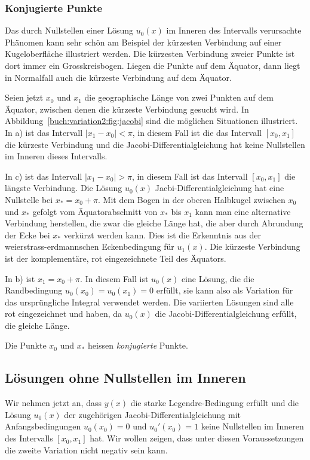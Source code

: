 %
%
\subsubsection{Konjugierte Punkte}

Das durch Nullstellen einer Lösung $u_0(x)$ im Inneren des Intervalls
verursachte Phänomen kann sehr schön am Beispiel der kürzesten
Verbindung auf einer Kugeloberfläche illustriert werden.
Die kürzesten Verbindung zweier Punkte ist dort immer ein Grosskreisbogen.
Liegen die Punkte auf dem Äquator, dann liegt in Normalfall auch die
kürzeste Verbindung auf dem Äquator.

Seien jetzt $x_0$ und $x_1$ die geographische Länge von zwei Punkten
auf dem Äquator, zwischen denen die kürzeste Verbindung gesucht wird.
In Abbildung~\ref{buch:variation2:fig:jacobi} sind die möglichen
Situationen illustriert.
In a) ist das Intervall $|x_1-x_0|<\pi$, in diesem Fall ist die
das Intervall $[x_0,x_1]$ die kürzeste Verbindung und die 
Jacobi-Differentialgleichung hat keine Nullstellen im Inneren 
dieses Intervalls.

In c) ist das Intervall $|x_1-x_0|>\pi$, in diesem Fall ist das Intervall
$[x_0,x_1]$ die längste Verbindung.
Die Lösung $u_0(x)$ Jacbi-Differentialgleichung hat eine Nullstelle
bei $x_*=x_0+\pi$.
Mit dem Bogen in der oberen Halbkugel zwischen $x_0$ und $x_*$
gefolgt vom Äquatorabschnitt von $x_*$ bis $x_1$ kann man eine
alternative Verbindung herstellen, die zwar die gleiche Länge hat,
die aber durch Abrundung der Ecke bei $x_*$ verkürzt werden kann.
Dies ist die Erkenntnis aus der weierstrass-erdmannschen
Eckenbedingung für $u_1(x)$.
Die kürzeste Verbindung ist der komplementäre, rot eingezeichnete
Teil des Äquators.

In b) ist $x_1=x_0+\pi$.
In diesem Fall ist $u_0(x)$ eine Lösung, die die Randbedingung
$u_0(x_0)=u_0(x_1)=0$ erfüllt, sie kann also als Variation
für das ursprüngliche Integral verwendet werden.
Die variierten Lösungen sind alle rot eingezeichnet und haben,
da $u_0(x)$ die Jacobi-Differentialgleichung erfüllt, die gleiche
Länge.

Die Punkte $x_0$ und $x_*$ heissen {\em konjugierte} Punkte.
%

%
%
\subsection{Lösungen ohne Nullstellen im Inneren
\label{buch:variation2:jacobi:subsection:}}
Wir nehmen jetzt an, dass $y(x)$ die starke Legendre-Bedingung
erfüllt und die Lösung $u_0(x)$ der zugehörigen
Jacobi-Differentialgleichung mit Anfangsbedingungen $u_0(x_0)=0$
und $u_0'(x_0)=1$ keine Nullstellen im Inneren des Intervalls
$[x_0,x_1]$ hat.
Wir wollen zeigen, dass unter diesen Voraussetzungen die zweite
Variation nicht negativ sein kann.

